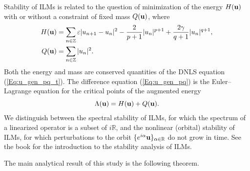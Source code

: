 \documentclass[12pt,reqno]{amsart}
\begin{document}
Stability of ILMs is related to the question of minimization of the energy $H({\bf u})$ with or without a constraint of fixed mass $Q({\bf u})$, where
\begin{align}
\label{energy}
H({\bf u}) &= \sum_{n \in \mathbb{Z}} \varepsilon |u_{n+1}-u_n|^2  - \frac{2}{p+1} |u_n|^{p+1} + \frac{2 \gamma}{q+1} |u_n|^{q+1}, \\
\label{mass}
Q({\bf u}) &= \sum_{n \in \mathbb{Z}} |u_n|^2. 
\end{align} 
Both the energy and mass are conserved quantities of the DNLS equation (\ref{Eq:u_gen_pq_t}). The difference equation (\ref{Eq:u_gen_pq}) is the Euler--Lagrange equation for the critical points of the augmented energy 
\begin{equation}
\label{aug-energy}
\Lambda({\bf u}) = H({\bf u}) + Q({\bf u}).
\end{equation}
We distinguish between the spectral stability of ILMs, for which the spectrum of a linearized operator is a subset of $i \mathbb{R}$, and the nonlinear (orbital) stability of ILMs, for which perturbations to the orbit $\{ e^{i \alpha} {\bf u}\}_{\alpha \in \mathbb{R}}$ do not grow in time. See the book \cite{GP25} for the introduction to the stability analysis of ILMs.

The main analytical result of this study is the following theorem.
\end{document}
